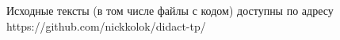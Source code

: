 
\LARGE



Исходные тексты (в том числе файлы с кодом) доступны по адресу https://github.com/nickkolok/didact-tp/






